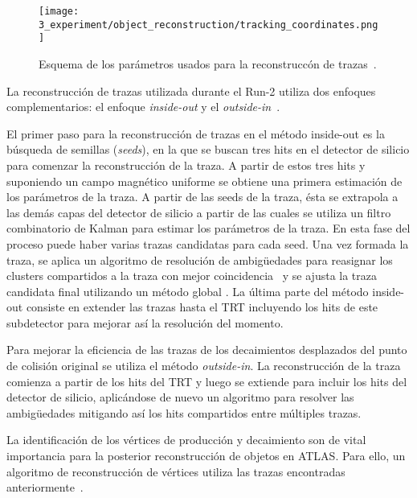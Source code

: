 \begin{figure}[ht!]
    \centering
    \texttt{[image: 3\_experiment/object\_reconstruction/tracking\_coordinates.png]}
    \caption{Esquema de los parámetros usados para la reconstruccón de trazas~\cite{ATLAS-Tracking-2007}.}
    \label{fig:objects:track_vtx:track_parameters}
\end{figure}

La reconstrucción de trazas utilizada durante el Run-2 utiliza dos enfoques complementarios: el enfoque \textit{inside-out} y el \textit{outside-in}~\cite{ATLAS-NEWT}.

El primer paso para la reconstrucción de trazas en el método inside-out es la búsqueda de semillas (\textit{seeds}), en la que se buscan tres hits en el detector de silicio para comenzar la reconstrucción de la traza. A partir de estos tres hits y suponiendo un campo magnético uniforme se obtiene una primera estimación de los parámetros de la traza. A partir de las seeds de la traza, ésta se extrapola a las demás capas del detector de silicio a partir de las cuales se utiliza un filtro combinatorio de Kalman para estimar los parámetros de la traza. En esta fase del proceso puede haber varias trazas candidatas para cada seed. Una vez formada la traza, se aplica un algoritmo de resolución de ambigüedades para reasignar los clusters compartidos a la traza con mejor coincidencia~\cite{ATLAS-NNClustering} y se ajusta la traza candidata final utilizando un método global \chisq. La última parte del método inside-out consiste en extender las trazas hasta el \ac{TRT} incluyendo los hits de este subdetector para mejorar así la resolución del momento.

Para mejorar la eficiencia de las trazas de los decaimientos desplazados del punto de colisión original se utiliza el método \textit{outside-in}. La reconstrucción de la traza comienza a partir de los hits del \ac{TRT} y luego se extiende para incluir los hits del detector de silicio, aplicándose de nuevo un algoritmo para resolver las ambigüedades mitigando así los hits compartidos entre múltiples trazas.

La identificación de los vértices de producción y decaimiento son de vital importancia para la posterior reconstrucción de objetos en \ac{ATLAS}.
Para ello, un algoritmo de reconstrucción de vértices utiliza las trazas encontradas anteriormente~\cite{ATLAS-PVReconstruction,ATLAS-VertexReconstruction}.

